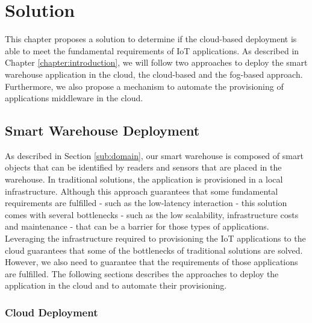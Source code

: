 
\chapter{Solution}
\label{chapter:solution}
This chapter proposes a solution to determine if the cloud-based deployment is able to meet the
fundamental requirements of \gls{IoT} applications. As described in Chapter \ref{chapter:introduction},
we will follow two approaches to deploy the smart warehouse application in the cloud, the cloud-based
and the fog-based approach. Furthermore, we also propose a mechanism to automate the provisioning of
applications middleware in the cloud.

\section{Smart Warehouse Deployment}
\label{sec:smart_warehouse_deployment}
As described in Section \ref{sub:domain}, our smart warehouse is composed of smart objects that
can be identified by readers and sensors that are placed in the warehouse. In traditional solutions,
the application is provisioned in a local infrastructure. Although this approach guarantees that
some fundamental requirements are fulfilled - such as the low-latency interaction - this solution
comes with several bottlenecks - such as the low scalability, infrastructure costs and maintenance -
that can be a barrier for those types of applications.\\

Leveraging the infrastructure required to provisioning the \gls{IoT} applications to the cloud
guarantees that some of the bottlenecks of traditional solutions are solved. However, we also need
to guarantee that the requirements of those applications are fulfilled. The following sections
describes the approaches to deploy the application in the cloud and to automate their
provisioning.

\subsection{Cloud Deployment}
\label{sub:sol_cloud}

